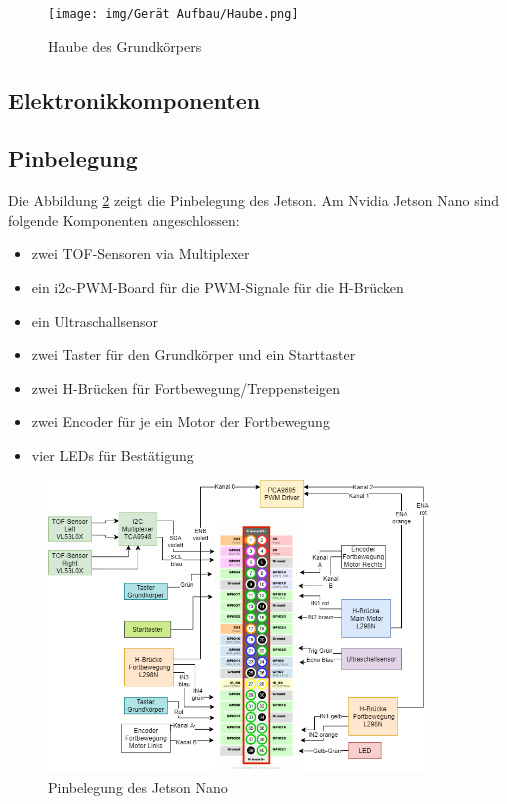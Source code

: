\begin{figure}[H]
  \texttt{[image: img/Gerät Aufbau/Haube.png]}
  \centering
  \caption{Haube des Grundkörpers}
  \label{fig:Haube}
\end{figure}






\newpage

\subsection{Elektronikkomponenten}
\subsection{Pinbelegung}
Die Abbildung \ref{fig:pinout-raspi} zeigt die Pinbelegung des Jetson. Am Nvidia Jetson Nano sind folgende Komponenten angeschlossen:

\begin{itemize}
    \item zwei TOF-Sensoren via Multiplexer
    \item ein \acrshort{i2c}-PWM-Board für die PWM-Signale für die H-Brücken 
    \item ein Ultraschallsensor
    \item zwei Taster für den Grundkörper und ein Starttaster
    \item zwei H-Brücken für Fortbewegung/Treppensteigen
    \item zwei Encoder für je ein Motor der Fortbewegung
    \item vier LEDs für Bestätigung
\end{itemize} 

\begin{figure}[H]
  \includegraphics[width=0.9\textwidth]{img/Elektronik/pinout_raspi_ohne_expander.png}
  \centering
  \caption{Pinbelegung des Jetson Nano}
  \label{fig:pinout-raspi}
\end{figure}


